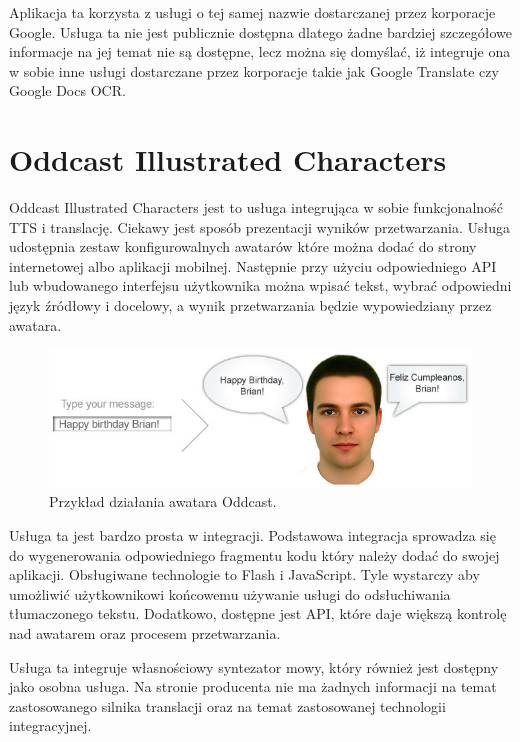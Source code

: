 Aplikacja ta korzysta z usługi o tej samej nazwie dostarczanej przez korporacje Google. Usługa ta nie jest publicznie dostępna dlatego żadne bardziej szczegółowe informacje na jej temat nie są dostępne, lecz można się domyślać, iż integruje ona w sobie inne usługi dostarczane przez korporacje takie jak Google Translate czy Google Docs OCR. 

\section {Oddcast Illustrated Characters}

Oddcast Illustrated Characters\cite{oddcasts} jest to usługa integrująca w sobie funkcjonalność TTS i translację. Ciekawy jest sposób prezentacji wyników przetwarzania. Usługa udostępnia zestaw konfigurowalnych awatarów które można dodać do strony internetowej albo aplikacji mobilnej. Następnie przy użyciu odpowiedniego API lub wbudowanego interfejsu użytkownika można wpisać tekst, wybrać odpowiedni język źródłowy i docelowy, a wynik przetwarzania będzie wypowiedziany przez awatara.

\begin{figure}[!h]
	\centering
	\includegraphics[scale=0.60]{oddcast.png}
	\caption{Przykład działania awatara Oddcast\cite{oddcasts}. }\label{fig:oddcast}
\end{figure}

Usługa ta jest bardzo prosta w integracji. Podstawowa integracja sprowadza się do wygenerowania odpowiedniego fragmentu kodu który należy dodać do swojej aplikacji. Obsługiwane technologie to Flash i JavaScript. Tyle wystarczy aby umożliwić użytkownikowi końcowemu używanie usługi do odsłuchiwania tłumaczonego tekstu. Dodatkowo, dostępne jest API, które daje większą kontrolę nad awatarem oraz procesem przetwarzania. 

Usługa ta integruje własnościowy syntezator mowy, który również jest dostępny jako osobna usługa. Na stronie producenta nie ma żadnych informacji na temat zastosowanego silnika translacji oraz na temat zastosowanej technologii integracyjnej.


